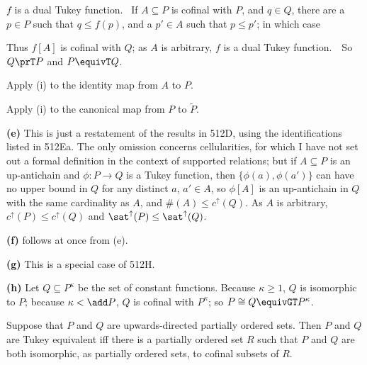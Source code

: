 {$f$ is a dual Tukey function.   \Prf\ If $A\subseteq P$ is cofinal with
$P$, and $q\in Q$, there are a $p\in P$ such that $q\le f(p)$, and a
$p'\in A$ such that $p\le p'$;  in which case


\noindent Thus $f[A]$ is cofinal with $Q$;  as $A$ is arbitrary, $f$ is a
dual Tukey function.\ \QeD\  So $Q\prT P$ and $P\equivT Q$.

\medskip

 Apply (i) to the identity map from $A$ to $P$.

\medskip

 Apply (i) to the canonical map from $P$ to $\tilde P$.

\medskip

{\bf (e)} This is just a restatement of the results in 512D, using the
identifications listed in 512Ea.   The only omission concerns
cellularities, for which I have not set out a formal definition in the
context of supported relations;  but if $A\subseteq P$ is an
up-antichain and $\phi:P\to Q$ is a Tukey function, then
$\{\phi(a),\phi(a')\}$ can have no upper bound in $Q$ for any distinct
$a$, $a'\in A$, so $\phi[A]$ is an up-antichain in $Q$ with the same
cardinality as $A$, and $\#(A)\le c^{\uparrow}(Q)$.   As $A$ is
arbitrary, $c^{\uparrow}(P)\le c^{\uparrow}(Q)$ and
$\sat^{\uparrow}(P)\le\sat^{\uparrow}(Q)$.

\medskip

{\bf (f)} follows at once from (e).

\medskip

{\bf (g)} This is a special case of 512H.

\medskip

{\bf (h)} Let $Q\subseteq P^{\kappa}$ be the set of constant functions.
Because $\kappa\ge 1$, $Q$ is isomorphic to $P$;  because
$\kappa<\add P$, $Q$ is cofinal with $P^{\kappa}$;  so
$P\cong Q\equivGT P^{\kappa}$.
}%

 Suppose that $P$ and
$Q$ are upwards-directed partially ordered sets.   Then $P$ and $Q$ are
Tukey equivalent iff there is a partially ordered set $R$
such that $P$ and $Q$ are both isomorphic, as partially ordered sets, to
cofinal subsets of $R$.

